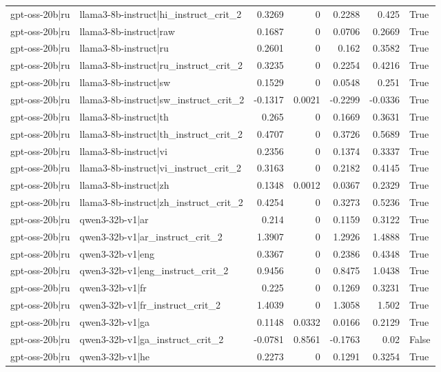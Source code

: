 \begin{table}
\begin{tabular}{l l r r r r l}
gpt-oss-20b|ru & llama3-8b-instruct|hi_instruct_crit_2 & 0.3269 & 0 & 0.2288 & 0.425 & True \\
gpt-oss-20b|ru & llama3-8b-instruct|raw & 0.1687 & 0 & 0.0706 & 0.2669 & True \\
gpt-oss-20b|ru & llama3-8b-instruct|ru & 0.2601 & 0 & 0.162 & 0.3582 & True \\
gpt-oss-20b|ru & llama3-8b-instruct|ru_instruct_crit_2 & 0.3235 & 0 & 0.2254 & 0.4216 & True \\
gpt-oss-20b|ru & llama3-8b-instruct|sw & 0.1529 & 0 & 0.0548 & 0.251 & True \\
gpt-oss-20b|ru & llama3-8b-instruct|sw_instruct_crit_2 & -0.1317 & 0.0021 & -0.2299 & -0.0336 & True \\
gpt-oss-20b|ru & llama3-8b-instruct|th & 0.265 & 0 & 0.1669 & 0.3631 & True \\
gpt-oss-20b|ru & llama3-8b-instruct|th_instruct_crit_2 & 0.4707 & 0 & 0.3726 & 0.5689 & True \\
gpt-oss-20b|ru & llama3-8b-instruct|vi & 0.2356 & 0 & 0.1374 & 0.3337 & True \\
gpt-oss-20b|ru & llama3-8b-instruct|vi_instruct_crit_2 & 0.3163 & 0 & 0.2182 & 0.4145 & True \\
gpt-oss-20b|ru & llama3-8b-instruct|zh & 0.1348 & 0.0012 & 0.0367 & 0.2329 & True \\
gpt-oss-20b|ru & llama3-8b-instruct|zh_instruct_crit_2 & 0.4254 & 0 & 0.3273 & 0.5236 & True \\
gpt-oss-20b|ru & qwen3-32b-v1|ar & 0.214 & 0 & 0.1159 & 0.3122 & True \\
gpt-oss-20b|ru & qwen3-32b-v1|ar_instruct_crit_2 & 1.3907 & 0 & 1.2926 & 1.4888 & True \\
gpt-oss-20b|ru & qwen3-32b-v1|eng & 0.3367 & 0 & 0.2386 & 0.4348 & True \\
gpt-oss-20b|ru & qwen3-32b-v1|eng_instruct_crit_2 & 0.9456 & 0 & 0.8475 & 1.0438 & True \\
gpt-oss-20b|ru & qwen3-32b-v1|fr & 0.225 & 0 & 0.1269 & 0.3231 & True \\
gpt-oss-20b|ru & qwen3-32b-v1|fr_instruct_crit_2 & 1.4039 & 0 & 1.3058 & 1.502 & True \\
gpt-oss-20b|ru & qwen3-32b-v1|ga & 0.1148 & 0.0332 & 0.0166 & 0.2129 & True \\
gpt-oss-20b|ru & qwen3-32b-v1|ga_instruct_crit_2 & -0.0781 & 0.8561 & -0.1763 & 0.02 & False \\
gpt-oss-20b|ru & qwen3-32b-v1|he & 0.2273 & 0 & 0.1291 & 0.3254 & True \\

\end{tabular}
\end{table}
